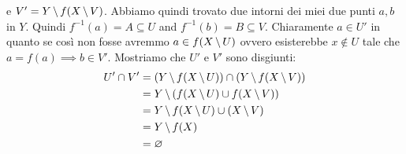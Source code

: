 \documentclass[a4paper]{article}
\begin{document}
\begin{snippetproof}{}
\begin{enumerate}
        e \(V' = Y \,\backslash\, f(X \,\backslash\, V)\).
        Abbiamo quindi trovato due intorni dei miei due punti \(a,b\)
        in \(Y\). Quindi
        \(f^{-1}(a) = A \subseteq U\) and \(f^{-1}(b) = B \subseteq V\).
        Chiaramente \(a \in U'\) in quanto se così non fosse avremmo \(a\in f(X \,\backslash\, U)\) ovvero
        esisterebbe \(x\notin U\) tale che \(a = f(a) \implies b \in V'\).
        Mostriamo che \(U'\) e \(V'\) sono disgiunti:
        \begin{align*}
            U' \cap V' &= (Y \,\backslash\, f(X \,\backslash\, U)) \cap (Y \,\backslash\, f(X \,\backslash\, V)) \\
            &= Y \,\backslash\, (f(X \,\backslash\, U) \cup f(X \,\backslash\, V)) \\
            &= Y \,\backslash\, f(X \,\backslash\, U) \cup (X \,\backslash\, V) \\
            &= Y \,\backslash\, f(X) \\
            &= \varnothing
        \end{align*}
    \end{enumerate}
\end{snippetproof}
\end{document}
